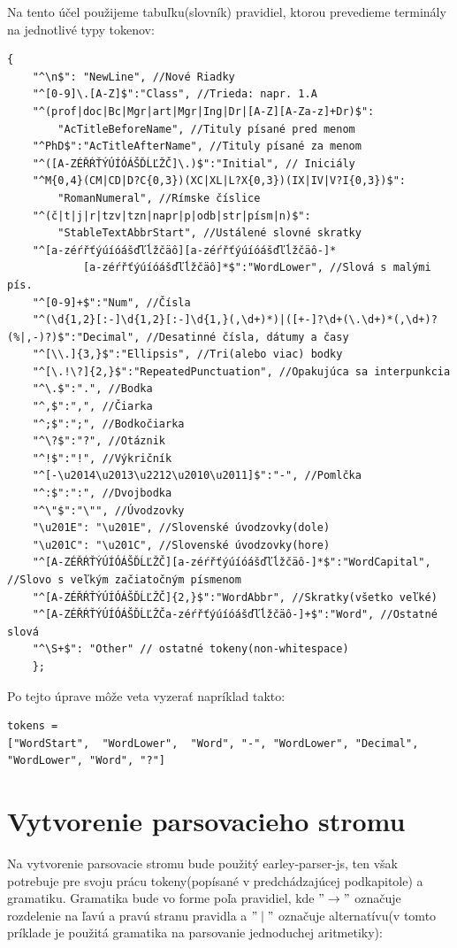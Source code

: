 \documentclass[12pt,a4paper]{report}
\theoremstyle{definition}
\theoremstyle{remark}
\begin{document}
Na tento účel použijeme tabuľku(slovník) pravidiel, ktorou prevedieme terminály na jednotlivé typy tokenov:\\
\newpage
\begin{lstlisting}[caption={Slovník s popisom},label={lst:label},style=htmlcssjs]
	{
	"^\n$": "NewLine", //Nové Riadky
	"^[0-9]\.[A-Z]$":"Class", //Trieda: napr. 1.A
	"^(prof|doc|Bc|Mgr|art|Mgr|Ing|Dr|[A-Z][A-Za-z]+Dr)$":
		"AcTitleBeforeName", //Tituly písané pred menom
	"^PhD$":"AcTitleAfterName", //Tituly písané za menom
	"^([A-ZÉŘŔŤÝÚÍÓÁŠĎĹĽŽČ]\.)$":"Initial", // Iniciály
	"^M{0,4}(CM|CD|D?C{0,3})(XC|XL|L?X{0,3})(IX|IV|V?I{0,3})$":
		"RomanNumeral", //Rímske číslice
	"^(č|t|j|r|tzv|tzn|napr|p|odb|str|písm|n)$":
		"StableTextAbbrStart", //Ustálené slovné skratky
	"^[a-zéŕřťýúíóášďľĺžčäô][a-zéŕřťýúíóášďľĺžčäô-]*
			[a-zéŕřťýúíóášďľĺžčäô]*$":"WordLower", //Slová s malými pís.
	"^[0-9]+$":"Num", //Čísla
	"^(\d{1,2}[:-]\d{1,2}[:-]\d{1,}(,\d+)*)|([+-]?\d+(\.\d+)*(,\d+)?(%|,-)?)$":"Decimal", //Desatinné čísla, dátumy a časy
	"^[\\.]{3,}$":"Ellipsis", //Tri(alebo viac) bodky
	"^[\.!\?]{2,}$":"RepeatedPunctuation", //Opakujúca sa interpunkcia
	"^\.$":".", //Bodka
	"^,$":",", //Čiarka
	"^;$":";", //Bodkočiarka
	"^\?$":"?", //Otáznik
	"^!$":"!", //Výkričník
	"^[-\u2014\u2013\u2212\u2010\u2011]$":"-", //Pomlčka
	"^:$":":", //Dvojbodka
	"^\"$":"\"", //Úvodzovky
	"\u201E": "\u201E", //Slovenské úvodzovky(dole)
	"\u201C": "\u201C", //Slovenské úvodzovky(hore)
	"^[A-ZÉŘŔŤÝÚÍÓÁŠĎĹĽŽČ][a-zéŕřťýúíóášďľĺžčäô-]*$":"WordCapital", //Slovo s veľkým začiatočným písmenom
	"^[A-ZÉŘŔŤÝÚÍÓÁŠĎĹĽŽČ]{2,}$":"WordAbbr", //Skratky(všetko veľké)
	"^[A-ZÉŘŔŤÝÚÍÓÁŠĎĹĽŽČa-zéŕřťýúíóášďľĺžčäô-]+$":"Word", //Ostatné slová
	"^\S+$": "Other" // ostatné tokeny(non-whitespace)
	};
\end{lstlisting}

\noindent Po tejto úprave môže veta vyzerať napríklad takto: \\
\begin{lstlisting}[caption={Tokeny po použití slovníku},style=htmlcssjs]
tokens = 
["WordStart",  "WordLower",  "Word", "-", "WordLower", "Decimal", "WordLower", "Word", "?"]
\end{lstlisting}

\section{Vytvorenie parsovacieho stromu}
Na vytvorenie parsovacie stromu bude použitý earley-parser-js, ten však potrebuje pre svoju prácu tokeny(popísané v predchádzajúcej podkapitole) a gramatiku. Gramatika bude vo forme poľa pravidiel, kde $"\to"$ označuje rozdelenie na ľavú a pravú stranu pravidla a $"\mid"$ označuje alternatívu(v tomto príklade je použitá gramatika na parsovanie jednoduchej aritmetiky):
\end{document}
